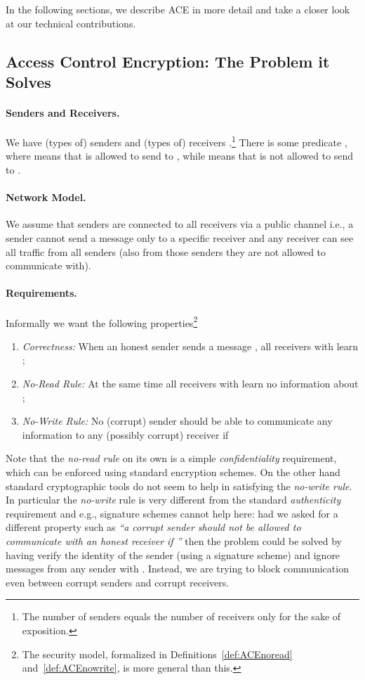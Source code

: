 \documentclass{llncs}
\begin{document}
In the following sections, we describe ACE in more detail and take a closer look at our technical contributions.


\subsection{Access Control Encryption: The Problem it Solves} 

\paragraph{Senders and Receivers.} We have  (types of) senders  and  (types of) receivers .\footnote{The number of senders equals the number of receivers only for the sake of exposition.} There is some predicate , where  means that  is allowed to send to , while  means that  is not allowed to send to . 

\paragraph{Network Model.} We assume that senders are connected to all receivers via a public channel i.e., a sender cannot send a message only to a specific receiver and any receiver can see all traffic from all senders (also from those senders they are not allowed to communicate with). 

\paragraph{Requirements.} Informally we want the following properties\footnote{The security model, formalized in Definitions~\ref{def:ACEnoread} and~\ref{def:ACEnowrite}, is more general than this.} 
\begin{enumerate}
\item \emph{Correctness:} When an honest sender  sends a message , all receivers  with  learn ;
\item \emph{No-Read Rule:} At the same time all receivers  with  learn no information about ;
\item \emph{No-Write Rule:} No (corrupt) sender  should be able to communicate any information to any (possibly corrupt) receiver  if 
\end{enumerate}

Note that the \emph{no-read rule} on its own is a simple \emph{confidentiality} requirement, which can be enforced using standard encryption schemes. On the other hand standard cryptographic tools do not seem to help in satisfying the \emph{no-write rule}.
In particular the \emph{no-write} rule is very different from the standard \emph{authenticity} requirement and e.g., signature schemes cannot help here: had we asked for a different property such as \emph{``a corrupt sender  should not be allowed to communicate with an honest receiver  if ''} then the problem could be solved by having  verify the identity of the sender (using a signature scheme) and ignore messages from any sender  with . Instead, we are trying to block communication even between corrupt senders and corrupt receivers. 
\end{document}
